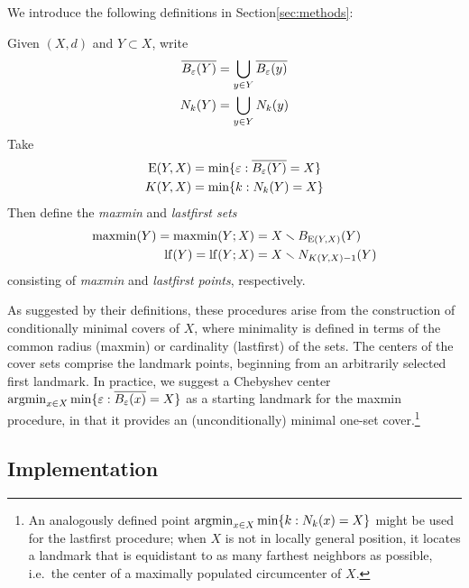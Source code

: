 \documentclass{article}
\begin{document}
We introduce the following definitions in Section\nbs\ref{sec:methods}:

\begin{definition}\label{def:maxmin-lastfirst}
    Given $(X,d)$ and $Y \subset X$, write
    \begin{align*}
    \overline{B_\varepsilon(Y)} &= \bigcup_{y \in Y}{\overline{B_\varepsilon(y)}} \\
    N_k(Y) &= \bigcup_{y \in Y}{N_k(y)}
    \end{align*}
    Take
    \begin{align*}
    {\mathrm{E}}(Y,X) &= \min\{ \varepsilon : \overline{B_\varepsilon(Y)} = X \} \\
    K(Y,X) &= \min\{ k : N_k(Y) = X \}
    \end{align*}
    Then define the \emph{maxmin} and \emph{lastfirst sets}
    \begin{align*}
    \operatorname{maxmin}(Y) = \operatorname{maxmin}(Y;X) &= X \smallsetminus B_{{\mathrm{E}}(Y,X)}(Y) \\
    \operatorname{lf}(Y) = \operatorname{lf}(Y;X) &= X \smallsetminus N_{K(Y,X) - 1}(Y)
    \end{align*}
    consisting of \emph{maxmin} and \emph{lastfirst points}, respectively.
\end{definition}

As suggested by their definitions, these procedures arise from the
construction of conditionally minimal covers of \(X\), where minimality
is defined in terms of the common radius (maxmin) or cardinality
(lastfirst) of the sets. The centers of the cover sets comprise the
landmark points, beginning from an arbitrarily selected first landmark.
In practice, we suggest a Chebyshev center
\(\operatorname{argmin}_{x \in X}{ \min\{ \varepsilon : \overline{B_\varepsilon(x)} = X \} }\) as a
starting landmark for the maxmin procedure, in that it provides an
(unconditionally) minimal one-set cover.\footnote{An analogously defined
  point \(\operatorname{argmin}_{x \in X}{ \min\{ k : N_k(x) = X \} }\) might be used
  for the lastfirst procedure; when \(X\) is not in locally general
  position, it locates a landmark that is equidistant to as many
  farthest neighbors as possible, i.e.~the center of a maximally
  populated circumcenter of \(X\).}

\hypertarget{implementation-1}{%
\subsection{Implementation}\label{implementation-1}}
\end{document}
